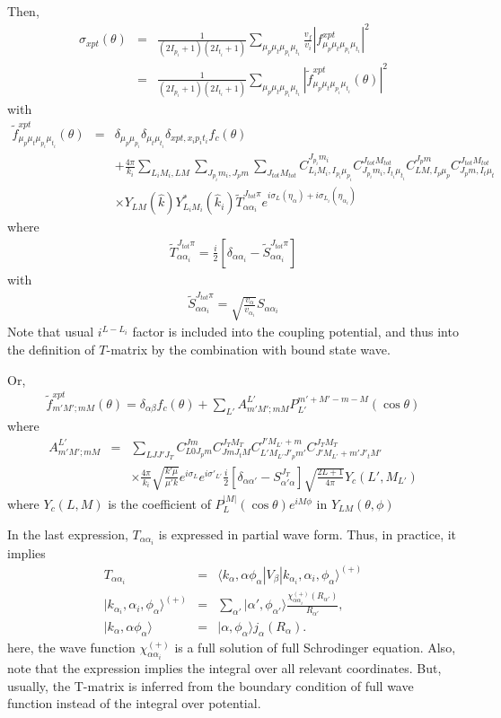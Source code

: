 \documentclass[11pt]{book}
\def\la{\langle}
\def\ra{\rangle}
\newcommand{\bea}{\begin{eqnarray}}
\newcommand{\eea}{\end{eqnarray}}
\newcommand{\no}{\nonumber \\}
\begin{document}
Then, 
\bea 
\sigma_{xpt}(\theta)&=&\frac{1}{(2I_{p_i}+1)(2I_{t_i}+1)}
    \sum_{\mu_p\mu_t\mu_{p_i}\mu_{t_i}} 
    \frac{v_f}{v_i} 
    |f^{xpt}_{\mu_p\mu_t\mu_{p_i}\mu_{t_i}}|^2 \no 
    &=& \frac{1}{(2I_{p_i}+1)(2I_{t_i}+1)}
        \sum_{\mu_p\mu_t\mu_{p_i}\mu_{t_i}}  
        |\widetilde{f}^{xpt}_{\mu_p\mu_t\mu_{p_i}\mu_{t_i}}(\theta)|^2
\eea 
with 
\bea 
\widetilde{f}^{xpt}_{\mu_p\mu_t\mu_{p_i}\mu_{t_i}}(\theta)
&=& \delta_{\mu_p\mu_{p_i}}\delta_{\mu_t\mu_{t_i}}\delta_{xpt,x_ip_i t_i}
    f_c(\theta) \no 
  & &+\frac{4\pi}{k_i}\sum_{L_i M_i, L M}\sum_{J_{p_i} m_i, J_p m}  
     \sum_{J_{tot} M_{tot}}
     C_{ L_i M_i, I_{p_i}\mu_{p_i}}^{J_{p_i}m_i}
     C_{J_{p_i} m_i,I_{t_i}\mu_{t_i}}^{J_{tot}M_{tot}}
     C_{L M, I_{p}\mu_{p}}^{J_{p}m}
     C_{J_{p} m,I_{t}\mu_{t}}^{J_{tot}M_{tot}}
     \no & &\times 
     Y_{LM}(\hat{k})Y^*_{L_i M_i}(\hat{k}_i)
     \tilde{T}^{J_{tot}\pi}_{\alpha\alpha_i}
     e^{i\sigma_L(\eta_\alpha)+i\sigma_{L_i}(\eta_{\alpha_i})}     
\eea 
where 
\bea
\tilde{T}^{J_{tot}\pi}_{\alpha\alpha_i}
=\frac{i}{2}[\delta_{\alpha\alpha_i}-\tilde{S}^{J_{tot}\pi}_{\alpha\alpha_i}]
\eea 
with
\bea 
\tilde{S}^{J_{tot}\pi}_{\alpha\alpha_i}
=\sqrt{\frac{v_\alpha}{v_{\alpha_i}}}S_{\alpha\alpha_i}
\eea 
Note that usual $i^{L-L_i}$ factor is included into the coupling potential,
and thus into the definition of $T$-matrix 
by the combination with bound state wave. 

Or, 
\bea 
\widetilde{f}^{xpt}_{m' M';m M}(\theta)
= \delta_{\alpha\beta}f_c(\theta)
 +\sum_{L'} A^{L'}_{m' M';m M} P_{L'}^{m'+M'-m-M}(\cos\theta) 
\eea 
where
\bea 
A^{L'}_{m'M';mM}&=& \sum_{LJJ' J_T} C^{Jm}_{L0 J_p m} C^{ J_T M_T}_{J m J_t M}
                            C^{J' M_{L'}+m}_{L' M_{L'} J'_{p} m'}
                            C^{J_T M_T}_{J' M_{L'}+m' J'_t M'}
                            \no & & \times 
                            \frac{4\pi}{k_i}\sqrt{\frac{k'\mu}{\mu' k}}
                            e^{i\sigma_L}e^{i\sigma'_{L'}}
                            \frac{i}{2}\left[\delta_{\alpha\alpha'}-S^{J_T}_{\alpha'\alpha}\right]
                            \sqrt{\frac{2L+1}{4\pi}}Y_c(L',M_{L'})
\eea 
where $Y_{c}(L,M)$ is the coefficient of $P^{|M|}_{L}(\cos\theta)e^{iM\phi}$ in $Y_{LM}(\theta,\phi)$




In the last expression, $T_{\alpha\alpha_i}$ is expressed in partial wave form.
Thus, in practice, it implies
\bea 
T_{\alpha\alpha_i}&=&
\la k_\alpha, \alpha \phi_\alpha | V_\beta| k_{\alpha_i}, \alpha_i,\phi_\alpha\ra^{(+)}\no 
| k_{\alpha_i}, \alpha_i,\phi_\alpha\ra^{(+)}
&=&\sum_{\alpha'} |\alpha',\phi_{\alpha'}\ra \frac{\chi_{\alpha\alpha_i}^{(+)}(R_{\alpha'})}{R_{\alpha'}},\no
|k_\alpha, \alpha \phi_\alpha \ra
&=& |\alpha,\phi_{\alpha}\ra j_\alpha(R_\alpha).
\eea 
here, the wave function $\chi_{\alpha\alpha_i}^{(+)}$ is a full 
solution of full Schrodinger equation. Also, note that the expression
implies the integral over all relevant coordinates. But, usually, the T-matrix
is inferred from the boundary condition of full wave function
instead of the integral over potential. 
\end{document}
